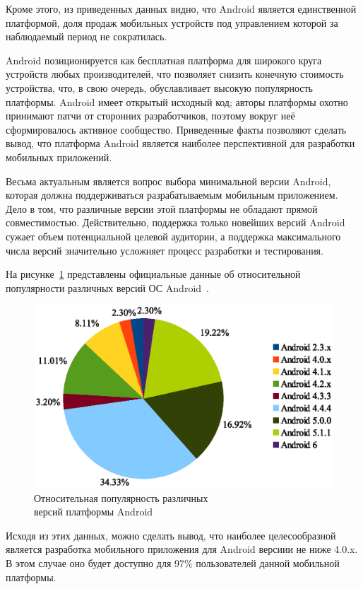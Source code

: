 Кроме этого, из приведенных данных видно, что Android является единственной
платформой, доля продаж мобильных устройств под управлением которой
за наблюдаемый период не сократилась.

Android позиционируется как бесплатная платформа для широкого круга устройств
любых производителей, что позволяет снизить конечную стоимость устройства,
что, в свою очередь, обуславливает высокую популярность платформы.
Android имеет открытый исходный код; авторы платформы
охотно принимают патчи от сторонних разработчиков,
поэтому вокруг неё сформировалось активное сообщество.
Приведенные факты позволяют сделать вывод, что платформа Android является наиболее
перспективной для разработки мобильных приложений.

Весьма актуальным является вопрос выбора минимальной версии Android,
которая должна поддерживаться разрабатываемым мобильным приложением.
Дело в том, что различные версии этой платформы не обладают прямой совместимостью.
Действительно, поддержка только новейших версий Android сужает объем потенциальной
целевой аудитории, а поддержка максимального числа версий значительно усложняет
процесс разработки и тестирования.

На рисунке~\ref{fig:stat_android} представлены официальные
данные об относительной популярности различных версий
ОС Android~\cite{google_stat_android}.

\begin{figure}[h!]
  \centering
  \includegraphics[width=150mm]{fig/stat_android.eps}
  \caption{Относительная популярность различных \\ версий платформы Android}
  \label{fig:stat_android}
\end{figure}

Исходя из этих данных, можно сделать вывод, что наиболее целесообразной
является разработка мобильного приложения для Android версиии не ниже 4.0.x.
В этом случае оно будет доступно для 97\% пользователей данной мобильной платформы.


